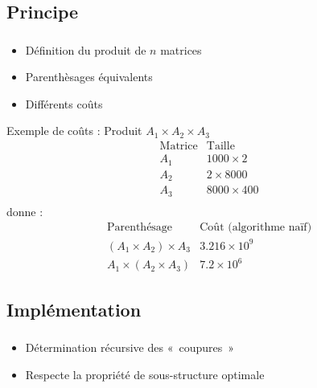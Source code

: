 \documentclass{beamer}
\begin{document}
\subsection{Principe}
\begin{frame}
  \frametitle{\insertsubsection}
  \begin{itemize}
  \item Définition du produit de $n$ matrices
  \item Parenthèsages équivalents
  \item Différents coûts
  \end{itemize}
  
Exemple de coûts : Produit $A_1 \times A_2 \times A_3$
\[
\begin{array}{cc} 
  \mbox{Matrice} & \mbox{Taille}\\
  A_1 & 1000 \times 2\\
  A_2 & 2 \times 8000\\
  A_3 & 8000 \times 400\\
\end{array}
\]
donne :
\[
\begin{array}{cc}
  \mbox{Parenthésage} & \mbox{Coût (algorithme naïf)}\\
  (A_1 \times A_2) \times A_3 & 3.216 \times 10^9\\
  A_1 \times (A_2 \times A_3) & 7.2 \times 10^6
\end{array}
\]




\end{frame}

\subsection{Implémentation}
\begin{frame}
  \frametitle{\insertsubsection}
  \begin{itemize}
  \item Détermination récursive des «~coupures~»
  \item Respecte la propriété de sous-structure optimale
  \end{itemize}
\end{frame}
\end{document}
